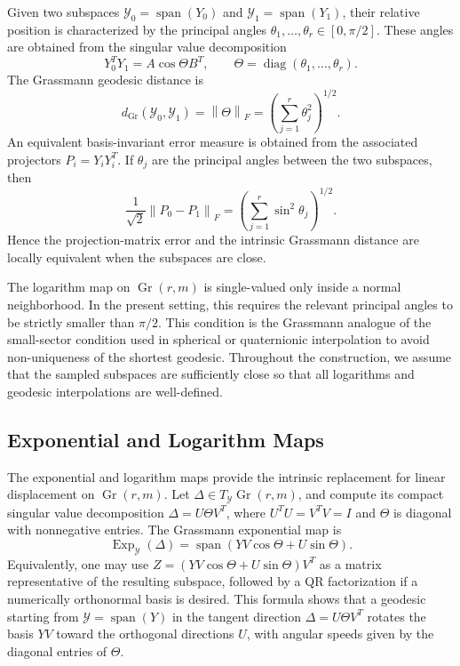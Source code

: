 \documentclass[a4paper,11pt]{article}
\newcommand{\Exp}{\operatorname{Exp}}
\DeclareMathOperator{\Gr}{Gr}
\DeclareMathOperator{\spanop}{span}
\DeclareMathOperator{\diag}{diag}
\newcommand{\cY}{\mathcal{Y}}
\newcommand{\norm}[1]{\left\lVert #1 \right\rVert}
\numberwithin{equation}{section}
\theoremstyle{plain}
\theoremstyle{definition}
\theoremstyle{remark}
\begin{document}
Given two subspaces \(\cY_0=\spanop(Y_0)\) and \(\cY_1=\spanop(Y_1)\), their relative position is characterized by the principal angles \(\theta_1,\ldots,\theta_r\in[0,\pi/2]\). These angles are obtained from the singular value decomposition
\[
    Y_0^T Y_1=A\cos\Theta B^T,
    \qquad
    \Theta=\diag(\theta_1,\ldots,\theta_r).
\]
The Grassmann geodesic distance is
\[
    d_{\Gr}(\cY_0,\cY_1)=\norm{\Theta}_F
    =\left(\sum_{j=1}^r\theta_j^2\right)^{1/2}.
\]
An equivalent basis-invariant error measure is obtained from the associated projectors \(P_i=Y_iY_i^T\). If \(\theta_j\) are the principal angles between the two subspaces, then
\[
    \frac{1}{\sqrt2}\norm{P_0-P_1}_F
    =\left(\sum_{j=1}^r\sin^2\theta_j\right)^{1/2}.
\]
Hence the projection-matrix error and the intrinsic Grassmann distance are locally equivalent when the subspaces are close.

The logarithm map on \(\Gr(r,m)\) is single-valued only inside a normal neighborhood. In the present setting, this requires the relevant principal angles to be strictly smaller than \(\pi/2\). This condition is the Grassmann analogue of the small-sector condition used in spherical or quaternionic interpolation to avoid non-uniqueness of the shortest geodesic. Throughout the construction, we assume that the sampled subspaces are sufficiently close so that all logarithms and geodesic interpolations are well-defined.

\subsection{Exponential and Logarithm Maps}

The exponential and logarithm maps provide the intrinsic replacement for linear displacement on \(\Gr(r,m)\). Let \(\Delta\in T_{\cY}\Gr(r,m)\), and compute its compact singular value decomposition \(\Delta=U\Theta V^T\), where \(U^TU=V^TV=I\) and \(\Theta\) is diagonal with nonnegative entries. The Grassmann exponential map is
\[
    \Exp_{\cY}(\Delta)=\spanop\left(YV\cos\Theta+U\sin\Theta\right).
\]
Equivalently, one may use \(Z=(YV\cos\Theta+U\sin\Theta)V^T\) as a matrix representative of the resulting subspace, followed by a QR factorization if a numerically orthonormal basis is desired. This formula shows that a geodesic starting from \(\cY=\spanop(Y)\) in the tangent direction \(\Delta=U\Theta V^T\) rotates the basis \(YV\) toward the orthogonal directions \(U\), with angular speeds given by the diagonal entries of \(\Theta\).
\end{document}

